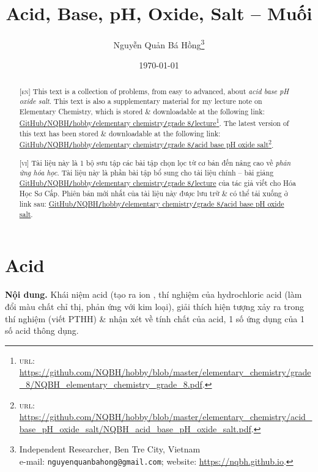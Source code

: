 \documentclass{article}
\title{Acid, Base, pH, Oxide, Salt -- Muối}
\author{Nguyễn Quản Bá Hồng\footnote{Independent Researcher, Ben Tre City, Vietnam\\e-mail: \texttt{nguyenquanbahong@gmail.com}; website: \url{https://nqbh.github.io}.}}
\date{\today}
\begin{document}
\maketitle
\begin{abstract}
	\textsc{[en]} This text is a collection of problems, from easy to advanced, about \textit{acid base pH oxide salt}. This text is also a supplementary material for my lecture note on Elementary Chemistry, which is stored \& downloadable at the following link: \href{https://github.com/NQBH/hobby/blob/master/elementary_chemistry/grade_8/NQBH_elementary_chemistry_grade_8.pdf}{GitHub\texttt{/}NQBH\texttt{/}hobby\texttt{/}elementary chemistry\texttt{/}grade 8\texttt{/}lecture}\footnote{\textsc{url}: \url{https://github.com/NQBH/hobby/blob/master/elementary_chemistry/grade_8/NQBH_elementary_chemistry_grade_8.pdf}.}. The latest version of this text has been stored \& downloadable at the following link: \href{https://github.com/NQBH/hobby/blob/master/elementary_chemistry/acid_base_pH_oxide_salt/NQBH_acid_base_pH_oxide_salt.pdf}{GitHub\texttt{/}NQBH\texttt{/}hobby\texttt{/}elementary chemistry\texttt{/}grade 8\texttt{/}acid base pH oxide salt}\footnote{\textsc{url}: \url{https://github.com/NQBH/hobby/blob/master/elementary_chemistry/acid_base_pH_oxide_salt/NQBH_acid_base_pH_oxide_salt.pdf}.}.
	\vspace{2mm}
	
	\textsc{[vi]} Tài liệu này là 1 bộ sưu tập các bài tập chọn lọc từ cơ bản đến nâng cao về \textit{phản ứng hóa học}. Tài liệu này là phần bài tập bổ sung cho tài liệu chính -- bài giảng \href{https://github.com/NQBH/hobby/blob/master/elementary_chemistry/grade_8/NQBH_elementary_chemistry_grade_8.pdf}{GitHub\texttt{/}NQBH\texttt{/}hobby\texttt{/}elementary chemistry\texttt{/}grade 8\texttt{/}lecture} của tác giả viết cho Hóa Học Sơ Cấp. Phiên bản mới nhất của tài liệu này được lưu trữ \& có thể tải xuống ở link sau: \href{https://github.com/NQBH/hobby/blob/master/elementary_chemistry/grade_8/real/NQBH_real.pdf}{GitHub\texttt{/}NQBH\texttt{/}hobby\texttt{/}elementary chemistry\texttt{/}grade 8\texttt{/}acid base pH oxide salt}.
\end{abstract}
\setcounter{secnumdepth}{4}
\setcounter{tocdepth}{3}
\tableofcontents
\newpage


\section{Acid}
\textsf{\textbf{Nội dung.} Khái niệm acid (tạo ra ion , thí nghiệm của hydrochloric acid (làm đổi màu chất chỉ thị, phản ứng với kim loại), giải thích hiện tượng xảy ra trong thí nghiệm (viết PTHH) \& nhận xét về tính chất của acid, 1 số ứng dụng của 1 số acid thông dụng.}
\end{document}
